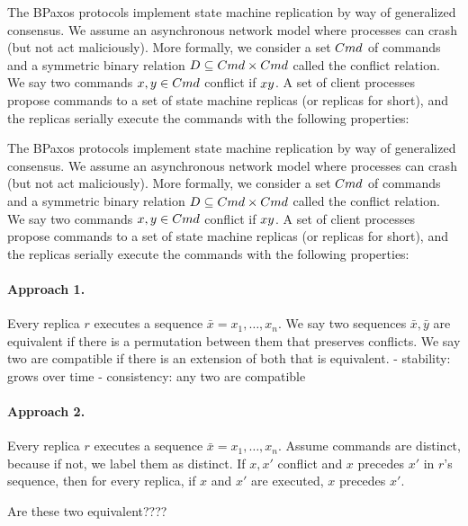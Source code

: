 {}

The BPaxos protocols implement state machine replication by way of generalized consensus. We assume an asynchronous network model where processes can crash (but not act maliciously). More formally, we consider a set $Cmd$ of commands and a symmetric binary relation $D \subseteq Cmd \times Cmd$ called the conflict relation. We say two commands $x, y \in Cmd$ conflict if $x  y$. A set of client processes propose commands to a set of state machine replicas (or replicas for short), and the replicas serially execute the commands with the following properties:

\vspace{3in}

The BPaxos protocols implement state machine replication by way of generalized consensus. We assume an asynchronous network model where processes can crash (but not act maliciously). More formally, we consider a set $Cmd$ of commands and a symmetric binary relation $D \subseteq Cmd \times Cmd$ called the conflict relation. We say two commands $x, y \in Cmd$ conflict if $x  y$. A set of client processes propose commands to a set of state machine replicas (or replicas for short), and the replicas serially execute the commands with the following properties:





\paragraph{Approach 1.}
Every replica $r$ executes a sequence $\bar{x} = x_1, \ldots, x_n$. We say two
sequences $\bar{x}, \bar{y}$ are equivalent if there is a permutation between
them that preserves conflicts. We say two are compatible if there is an
extension of both that is equivalent.
  - stability: grows over time
  - consistency: any two are compatible


\paragraph{Approach 2.}
Every replica $r$ executes a sequence $\bar{x} = x_1, \ldots, x_n$. Assume
commands are distinct, because if not, we label them as distinct. If $x, x'$ conflict and $x$ precedes $x'$ in $r$'s sequence, then for every replica, if $x$ and $x'$ are executed, $x$ precedes $x'$.

Are these two equivalent????

